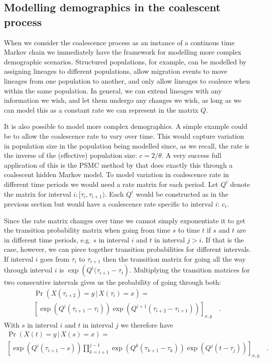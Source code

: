 \subsection{Modelling demographics in the coalescent process}

When we consider the coalescence process as an instance of a continous time Markov chain we immediately have the framework for modelling more complex demographic scenarios. Structured populations, for example, can be modelled by assigning lineages to different populations, allow migration events to move lineages from one population to another, and only allow lineages to coalesce when within the same population. In general, we can extend lineages with any information we wish, and let them undergo any changes we wish, as long as we can model this as a constant rate we can represent in the matrix $Q$.

It is also possible to model more complex demographics. A simple example could be to allow the coalescence rate to vary over time. This would capture variation in population size in the population being modelled since, as we recall, the rate is the inverse of the (effective) population size: $c=2/\theta$. A very success full application of this is the PSMC method by \citet{Li:2011ez} that does exactly this through a coalescent hidden Markov model. To model variation in coalescence rate in different time periods we would need a rate matrix for each period. Let $Q^i$ denote the matrix for interval $i: [\tau_i,\tau_{i+1})$. Each $Q^i$ would be constructed as in the previous section but would have a coalescence rate specific to interval $i$: $c_i$.

Since the rate matrix changes over time we cannot simply exponentiate it to get the transition probability matrix when going from time $s$ to time $t$ if $s$ and $t$ are in different time periods, e.g. $s$ in interval $i$ and $t$ in interval $j>i$. If that is the case, however, we can piece together transition probabilities for different intervals. If interval $i$ goes from $\tau_i$ to $\tau_{i+1}$ then the transition matrix for going all the way through interval $i$ is $\exp\left(Q^i(\tau_{i+1}-\tau_i\right)$. Multiplying the transition matrices for two consecutive intervals gives us the probability of going through both:
\begin{multline*}
  \Pr\left(X(\tau_{i+2})=y\,|\,X(\tau_i)=x\right) = \\
   \left[\exp\left(Q^i\left(\tau_{i+1}-\tau_i\right)\right)
         \exp\left(Q^{i+1}\left(\tau_{i+2}-\tau_{i+1}\right)\right)
   \right]_{x,y}
   \quad .
\end{multline*}
With $s$ in interval $i$ and $t$ in interval $j$ we therefore have\begin{multline*}
  \Pr\left(X(t)=y\,|\,X(s)=x\right) = \\
  \left[
      \exp\left(Q^i\left(\tau_{i+1}-s\right)\right)
      \prod_{k=i+1}^{j-1} \exp\left(Q^k\left(\tau_{k+1}-\tau_k\right)\right)
      \exp\left(Q^j\left(t-\tau_j\right)\right)
  \right]_{x,y}
  \quad .
\end{multline*}

